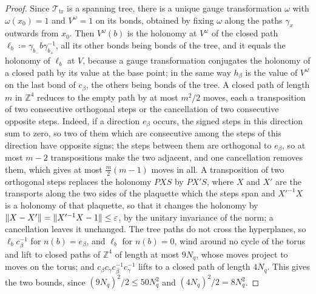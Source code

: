 \documentclass[11pt]{preprint}
\DeclarePairedDelimiter{\norm}{\lVert}{\rVert}
\numberwithin{equation}{section}
\theoremstyle{definition}
\theoremstyle{remark}
\theoremstyle{plain}
\begin{document}
\begin{proof}
Since $\mathcal T_{\mathrm{tr}}$ is a spanning tree, there is a unique gauge transformation $\omega$ with $\omega(x_0) = 1$ and $V^\omega = 1$ on its bonds, obtained by fixing $\omega$ along the paths $\gamma_x$ outwards from $x_0$. Then $V^\omega(b)$ is the holonomy at $V^\omega$ of the closed path $\ell_b \coloneqq \gamma_{b_-}b\gamma_{b_+}^{-1}$, all its other bonds being bonds of the tree, and it equals the holonomy of $\ell_b$ at $V$, because a gauge transformation conjugates the holonomy of a closed path by its value at the base point; in the same way $h_\beta$ is the value of $V^\omega$ on the last bond of $c_\beta$, the others being bonds of the tree. A closed path of length $m$ in $\mathbb Z^4$ reduces to the empty path by at most $m^2/2$ moves, each a transposition of two consecutive orthogonal steps or the cancellation of two consecutive opposite steps. Indeed, if a direction $e_\beta$ occurs, the signed steps in this direction sum to zero, so two of them which are consecutive among the steps of this direction have opposite signs; the steps between them are orthogonal to $e_\beta$, so at most $m - 2$ transpositions make the two adjacent, and one cancellation removes them, which gives at most $\frac m2(m - 1)$ moves in all. A transposition of two orthogonal steps replaces the holonomy $PXS$ by $PX'S$, where $X$ and $X'$ are the transports along the two sides of the plaquette which the steps span and $X'^{-1}X$ is a holonomy of that plaquette, so that it changes the holonomy by $\norm{X - X'} = \norm{X'^{-1}X - 1} \leq \varepsilon$, by the unitary invariance of the norm; a cancellation leaves it unchanged. The tree paths do not cross the hyperplanes, so $\ell_bc_\beta^{-1}$ for $n(b) = e_\beta$, and $\ell_b$ for $n(b) = 0$, wind around no cycle of the torus and lift to closed paths of $\mathbb Z^4$ of length at most $9N_q$, whose moves project to moves on the torus; and $c_\beta c_\gamma c_\beta^{-1}c_\gamma^{-1}$ lifts to a closed path of length $4N_q$. This gives the two bounds, since $(9N_q)^2/2 \leq 50N_q^2$ and $(4N_q)^2/2 = 8N_q^2$.
\end{proof}
\end{document}
